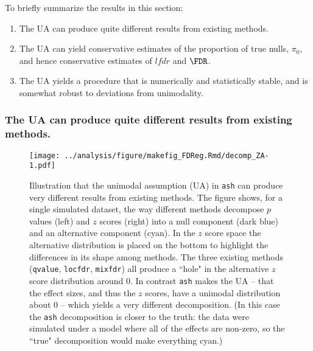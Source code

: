 \documentclass[11pt]{article}
\def\lfdr{\textit{lfdr}}
\def\qvalue{{\tt qvalue}\xspace}
\def\locfdr{{\tt locfdr}\xspace}
\def\mixfdr{{\tt mixfdr}\xspace}
\def\ash{{\tt ash}\xspace}
\begin{document}
To briefly summarize the results in this section:
\begin{enumerate}
\item The UA can produce quite different results from existing methods.
\item The UA can yield conservative estimates of the proportion of true nulls, $\pi_0$, and hence conservative estimates of $\lfdr$ and $\FDR$.
\item The UA yields a procedure that is numerically and statistically stable, and is somewhat robust to deviations from unimodality.
\end{enumerate}

\subsubsection*{The UA can produce quite different results from existing methods.}

\begin{figure}
\center \texttt{[image: ../analysis/figure/makefig\_FDReg.Rmd/decomp\_ZA-1.pdf]}
\caption{Illustration that the unimodal assumption (UA) in \ash can produce very different results from existing methods.
The figure shows, for a single simulated dataset, the way different methods decompose $p$ values (left) and $z$ scores (right) into a null component (dark blue) and an alternative component (cyan). In the $z$ score space the alternative distribution is placed on the bottom to highlight the differences in its shape among methods.
The three existing methods (\qvalue, \locfdr, \mixfdr) all produce a ``hole" in the alternative $z$ score distribution around 0.
In contrast \ash makes the UA -- that the effect sizes, and thus the $z$ scores, have a unimodal distribution about 0 -- which yields a very different decomposition. (In this case the \ash decomposition is closer to the truth: the data were simulated under a model where all of the effects are non-zero, so the ``true" decomposition would make everything cyan.)} \label{fig:ZA}
\end{figure}
\end{document}
